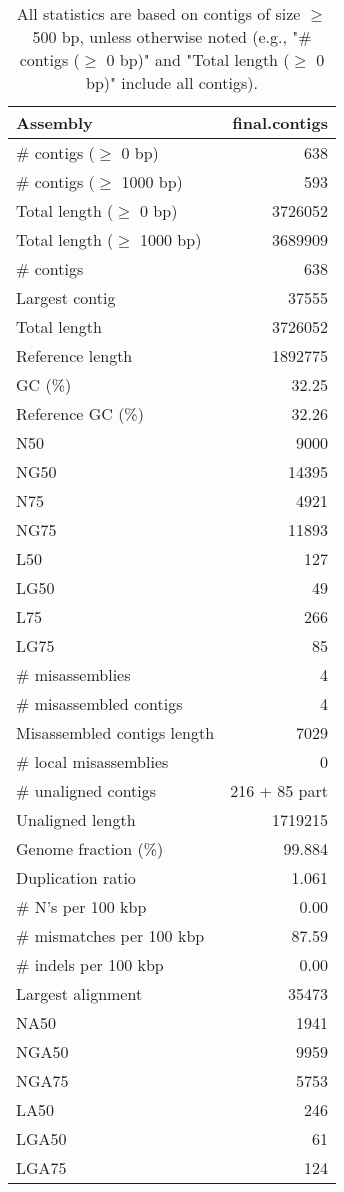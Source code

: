 \documentclass[12pt,a4paper]{article}
\begin{document}
\begin{table}[ht]
\begin{center}
\caption{All statistics are based on contigs of size $\geq$ 500 bp, unless otherwise noted (e.g., "\# contigs ($\geq$ 0 bp)" and "Total length ($\geq$ 0 bp)" include all contigs).}
\begin{tabular}{|l*{1}{|r}|}
\hline
Assembly & final.contigs \\ \hline
\# contigs ($\geq$ 0 bp) & 638 \\ \hline
\# contigs ($\geq$ 1000 bp) & 593 \\ \hline
Total length ($\geq$ 0 bp) & 3726052 \\ \hline
Total length ($\geq$ 1000 bp) & 3689909 \\ \hline
\# contigs & 638 \\ \hline
Largest contig & 37555 \\ \hline
Total length & 3726052 \\ \hline
Reference length & 1892775 \\ \hline
GC (\%) & 32.25 \\ \hline
Reference GC (\%) & 32.26 \\ \hline
N50 & 9000 \\ \hline
NG50 & 14395 \\ \hline
N75 & 4921 \\ \hline
NG75 & 11893 \\ \hline
L50 & 127 \\ \hline
LG50 & 49 \\ \hline
L75 & 266 \\ \hline
LG75 & 85 \\ \hline
\# misassemblies & 4 \\ \hline
\# misassembled contigs & 4 \\ \hline
Misassembled contigs length & 7029 \\ \hline
\# local misassemblies & 0 \\ \hline
\# unaligned contigs & 216 + 85 part \\ \hline
Unaligned length & 1719215 \\ \hline
Genome fraction (\%) & 99.884 \\ \hline
Duplication ratio & 1.061 \\ \hline
\# N's per 100 kbp & 0.00 \\ \hline
\# mismatches per 100 kbp & 87.59 \\ \hline
\# indels per 100 kbp & 0.00 \\ \hline
Largest alignment & 35473 \\ \hline
NA50 & 1941 \\ \hline
NGA50 & 9959 \\ \hline
NGA75 & 5753 \\ \hline
LA50 & 246 \\ \hline
LGA50 & 61 \\ \hline
LGA75 & 124 \\ \hline
\end{tabular}
\end{center}
\end{table}
\end{document}
